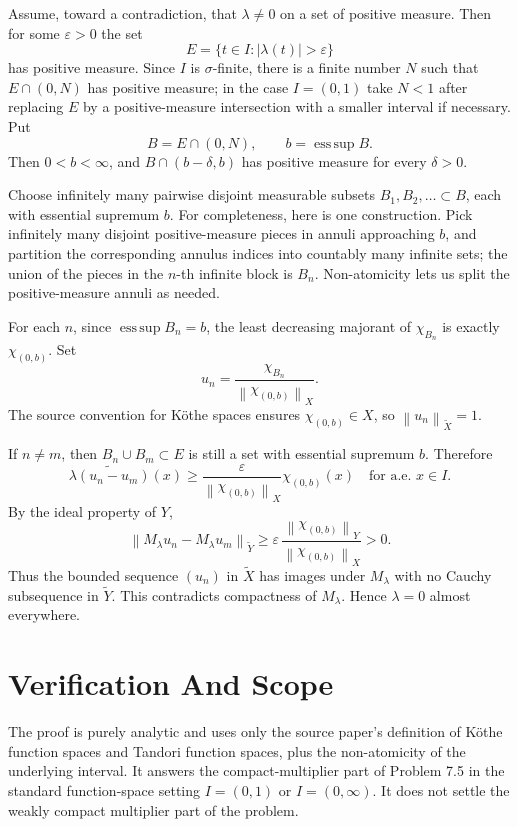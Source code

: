 \documentclass[11pt]{article}
\newcommand{\norm}[1]{\left\lVert #1 \right\rVert}
\begin{document}
Assume, toward a contradiction, that \(\lambda\ne 0\) on a set of positive
measure. Then for some \(\varepsilon>0\) the set
\[
  E=\{t\in I: |\lambda(t)|>\varepsilon\}
\]
has positive measure. Since \(I\) is \(\sigma\)-finite, there is a finite
number \(N\) such that \(E\cap(0,N)\) has positive measure; in the case
\(I=(0,1)\) take \(N<1\) after replacing \(E\) by a positive-measure
intersection with a smaller interval if necessary. Put
\[
  B=E\cap(0,N),\qquad b=\operatorname*{ess\,sup} B .
\]
Then \(0<b<\infty\), and \(B\cap(b-\delta,b)\) has positive measure for
every \(\delta>0\).

Choose infinitely many pairwise disjoint measurable subsets
\(B_1,B_2,\ldots\subset B\), each with essential supremum \(b\). For
completeness, here is one construction. Pick infinitely many disjoint
positive-measure pieces in annuli approaching \(b\), and partition the
corresponding annulus indices into countably many infinite sets; the union of
the pieces in the \(n\)-th infinite block is \(B_n\). Non-atomicity lets us
split the positive-measure annuli as needed.

For each \(n\), since \(\operatorname*{ess\,sup} B_n=b\), the least decreasing
majorant of \(\chi_{B_n}\) is exactly \(\chi_{(0,b)}\). Set
\[
  u_n=\frac{\chi_{B_n}}{\norm{\chi_{(0,b)}}_X}.
\]
The source convention for Köthe spaces ensures \(\chi_{(0,b)}\in X\), so
\(\norm{u_n}_{\widetilde X}=1\).

If \(n\ne m\), then \(B_n\cup B_m\subset E\) is still a set with essential
supremum \(b\). Therefore
\[
  \widetilde{\lambda(u_n-u_m)}(x)
  \ge \frac{\varepsilon}{\norm{\chi_{(0,b)}}_X}\chi_{(0,b)}(x)
  \quad\text{for a.e. }x\in I.
\]
By the ideal property of \(Y\),
\[
  \norm{M_\lambda u_n-M_\lambda u_m}_{\widetilde Y}
  \ge
  \varepsilon\,
  \frac{\norm{\chi_{(0,b)}}_Y}{\norm{\chi_{(0,b)}}_X}
  >0 .
\]
Thus the bounded sequence \((u_n)\) in \(\widetilde X\) has images under
\(M_\lambda\) with no Cauchy subsequence in \(\widetilde Y\). This contradicts
compactness of \(M_\lambda\). Hence \(\lambda=0\) almost everywhere.

\section*{Verification And Scope}

The proof is purely analytic and uses only the source paper's definition of
Köthe function spaces and Tandori function spaces, plus the non-atomicity of
the underlying interval. It answers the compact-multiplier part of Problem
7.5 in the standard function-space setting \(I=(0,1)\) or \(I=(0,\infty)\).
It does not settle the weakly compact multiplier part of the problem.
\end{document}
